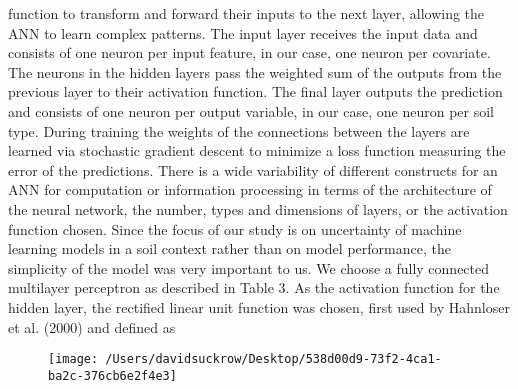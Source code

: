function to transform and forward their inputs to the next layer,
allowing the ANN to learn complex patterns. The input layer receives the
input data and consists of one neuron per input feature, in our case, one
neuron per covariate. The neurons in the hidden layers pass the
weighted sum of the outputs from the previous layer to their activation
function. The final layer outputs the prediction and consists of one
neuron per output variable, in our case, one neuron per soil type. During
training the weights of the connections between the layers are learned
via stochastic gradient descent to minimize a loss function measuring
the error of the predictions. There is a wide variability of different
constructs for an ANN for computation or information processing in
terms of the architecture of the neural network, the number, types and
dimensions of layers, or the activation function chosen. Since the focus
of our study is on uncertainty of machine learning models in a soil
context rather than on model performance, the simplicity of the model
was very important to us. We choose a fully connected multilayer perceptron
as described in Table 3. As the activation function for the hidden
layer, the rectified linear unit function was chosen, first used by Hahnloser
et al. (2000) and defined as 
\begin{figure}[h!]  %
    \centering      %
    \texttt{[image: /Users/davidsuckrow/Desktop/538d00d9-73f2-4ca1-ba2c-376cb6e2f4e3]}  %
    \label{fig:example}  %
\end{figure}